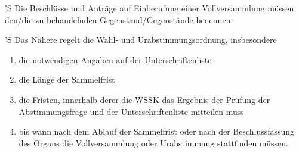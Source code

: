 \documentclass[fontsize=12pt,parskip=half]{scrartcl}
\begin{document}
\begin{contract}
  'S Die Beschlüsse und Anträge auf Einberufung einer Vollversammlung müssen
  den/die zu behandelnden Gegenstand/Gegenstände benennen.

  'S Das Nähere regelt die Wahl- und Urabstimmungsordnung, insbesondere
  \begin{enumerate}[\qquad 1.]
  \item die notwendigen Angaben auf der Unterschriftenliste
  \item die Länge der Sammelfrist
  \item die Fristen, innerhalb derer die WSSK das Ergebnis der Prüfung der
    Abstimmungsfrage und der Unterschriftenliste mitteilen muss
  \item   bis wann nach dem Ablauf der Sammelfrist oder nach der
    Beschlussfassung des Organs die Vollversammlung oder Urabstimmung
    stattfinden müssen.
  \end{enumerate}

\end{contract}
\end{document}
